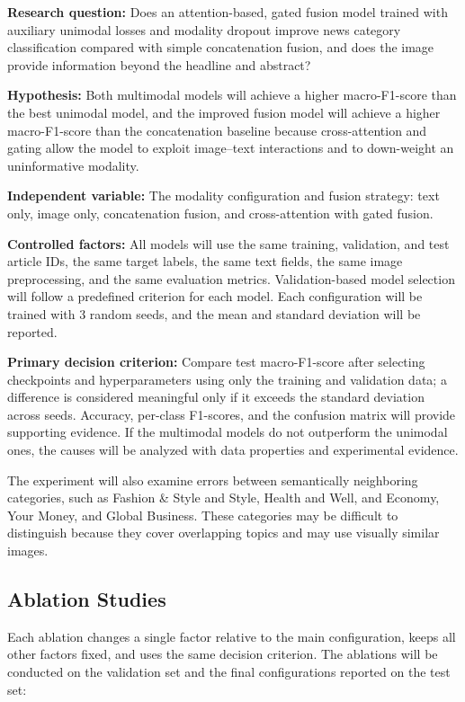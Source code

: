 \documentclass[11pt,a4paper]{article}
\begin{document}
\textbf{Research question:} Does an attention-based, gated fusion model trained with auxiliary unimodal losses and modality dropout improve news category classification compared with simple concatenation fusion, and does the image provide information beyond the headline and abstract?

\textbf{Hypothesis:} Both multimodal models will achieve a higher macro-F1-score than the best unimodal model, and the improved fusion model will achieve a higher macro-F1-score than the concatenation baseline because cross-attention and gating allow the model to exploit image--text interactions and to down-weight an uninformative modality.

\textbf{Independent variable:} The modality configuration and fusion strategy: text only, image only, concatenation fusion, and cross-attention with gated fusion.

\textbf{Controlled factors:} All models will use the same training, validation, and test article IDs, the same target labels, the same text fields, the same image preprocessing, and the same evaluation metrics. Validation-based model selection will follow a predefined criterion for each model. Each configuration will be trained with 3 random seeds, and the mean and standard deviation will be reported.

\textbf{Primary decision criterion:} Compare test macro-F1-score after selecting checkpoints and hyperparameters using only the training and validation data; a difference is considered meaningful only if it exceeds the standard deviation across seeds. Accuracy, per-class F1-scores, and the confusion matrix will provide supporting evidence. If the multimodal models do not outperform the unimodal ones, the causes will be analyzed with data properties and experimental evidence.

The experiment will also examine errors between semantically neighboring categories, such as Fashion \& Style and Style, Health and Well, and Economy, Your Money, and Global Business. These categories may be difficult to distinguish because they cover overlapping topics and may use visually similar images.

\subsection{Ablation Studies}\label{sec:ablation}

Each ablation changes a single factor relative to the main configuration, keeps all other factors fixed, and uses the same decision criterion. The ablations will be conducted on the validation set and the final configurations reported on the test set:
\end{document}
